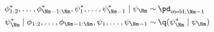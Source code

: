 \begin{align}
  \phi_{1:2}^{*}, \ldots, \phi_{\Nm - 1:\Nm}^{*}, \psi_{1}^{*}, \ldots, \psi_{\Nm - 1}^{*} \mid \psi_{\Nm} 
    \sim & \, 
    \pd_{\text{meld}, \Nm - 1}
  \\
  \psi_{\Nm}^{*} \mid \phi_{1:2}, \ldots, \phi_{\Nm - 1:\Nm}, \psi_{1}, \ldots, \psi_{\Nm - 1}
    \sim & \,
    \q(\psi_{\Nm}^{*} \mid \psi_{\Nm})
  \label{eqn:stage-M-gibbs-updates}
\end{align}
